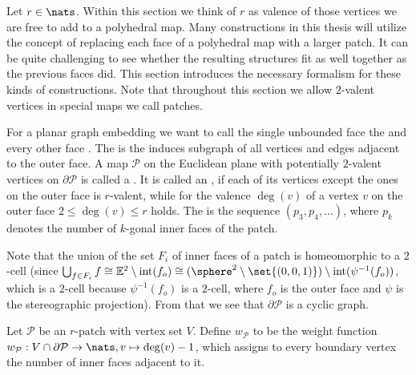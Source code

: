 \label{sec:construction}

Let $r \in \nats$. Within this section we think of $r$ as valence of those vertices we are free to add to a polyhedral map. Many constructions in this thesis will utilize the concept of replacing each face of a polyhedral map with a larger patch. It can be quite challenging to see whether the resulting structures fit as well together as the previous faces did. This section introduces the necessary formalism for these kinds of constructions. Note that throughout this section we allow $2$-valent vertices in special maps we call patches.
\clearpage
\begin{definition}[Patch] For a planar graph embedding we want to call the single unbounded face the  and every other face . The  is the induces subgraph of all vertices and edges adjacent to the outer face. A map $\mathcal{P}$ on the Euclidean plane with potentially $2$-valent vertices on $\partial\mathcal{P}$ is called a . It is called an , if each of its vertices except the ones on the outer face is $r$-valent, while for the valence $\deg(v)$ of a vertex $v$ on the outer face $2 \leq \deg(v) \leq r$ holds. The  is the sequence $(p_3, p_4, \dots)$, where $p_k$ denotes the number of $k$-gonal inner faces of the patch. 
\end{definition}

Note that the union of the set $F_{i}$ of inner faces of a patch is homeomorphic to a $2$-cell (since $\bigcup_{f \in F_{i}} f \cong \mathbb{E}^2 \setminus \operatorname{int}(f_{o}) \cong (\sphere^2 \setminus \set{(0, 0, 1)}) \setminus \operatorname{int}(\psi^{-1}(f_{o}))$, which is a $2$-cell because $\psi^{-1}(f_{o})$ is a $2$-cell, where $f_{o}$ is the outer face and $\psi$ is the stereographic projection). From that we see that $\partial\mathcal{P}$ is a cyclic graph.

\begin{definition} Let $\mathcal{P}$ be an $r$-patch with vertex set $V$. Define $w_{\mathcal{P}}$ to be the weight function $w_{\mathcal{P}} : V \cap \partial\mathcal{P} \to \nats, v \mapsto \deg(v) - 1$, which assigns to every boundary vertex the number of inner faces adjacent to it.
\end{definition}


